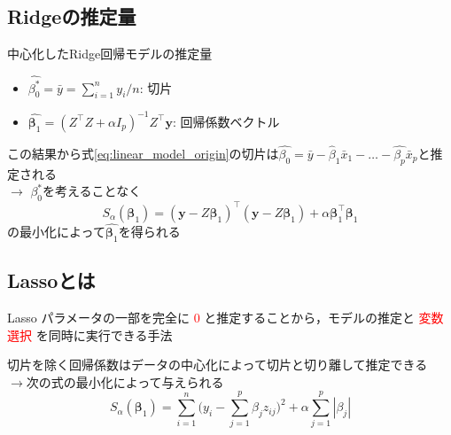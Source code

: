 \documentclass[dvipdfmx, 10pt]{beamer}
\begin{document}
\subsection{Ridgeの推定量}
\begin{frame}{\insertsubsection}
	中心化したRidge回帰モデルの推定量
	\begin{itemize}
	\item $\hat{\beta_0^*} = \bar{y} = \sum_{i=1}^n y_i / n$: 切片
	\item $\hat{\bm{\beta}_1} = (Z^{\top}Z + \alpha I_p)^{-1} Z^{\top} \bm{y}$: 回帰係数ベクトル
	\end{itemize}
    \vspace{10pt}
    この結果から式\eqref{eq:linear_model_origin}の切片は$\hat{\beta_0} = \bar{y} - \hat{\beta}_1 \bar{x}_1 - \dots - \hat{\beta_p} \bar{x}_p$と推定される\\
    \vspace{10pt}
    $\rightarrow$ \quad $\beta_0^*$を考えることなく
\begin{equation}
	S_{\alpha}(\bm{\beta}_1) = (\bm{y} - Z \bm{\beta}_1)^{\top}  (\bm{y} - Z\bm{\beta}_1) + \alpha \bm{\beta}_1^{\top} \bm{\beta}_1
	\label{eq:ridge_estimate_beta1hat}
\end{equation}
の最小化によって$\hat{\bm{\beta}_1}$を得られる
\end{frame}

\subsection{Lassoとは}
\begin{frame}{\insertsubsection}
    \begin{block}{Lasso}
        パラメータの一部を完全に
       \textcolor{red}{0}
        と推定することから，モデルの推定と
        \textcolor{red}{変数選択}
        を同時に実行できる手法
    \end{block}
    \vspace{10pt}
    切片を除く回帰係数はデータの中心化によって切片と切り離して推定できる\\
    $\rightarrow$次の式の最小化によって与えられる
    \begin{equation}
        S_{\alpha}(\bm\beta_1) = \sum_{i=1}^{n} \bigl(
        	y_i - \sum_{j=1}^{p} \beta_j z_{ij}
        \bigr)^2 + \alpha \sum_{j=1}^{p}|\beta_j|
    \end{equation}
\end{frame}
\end{document}
